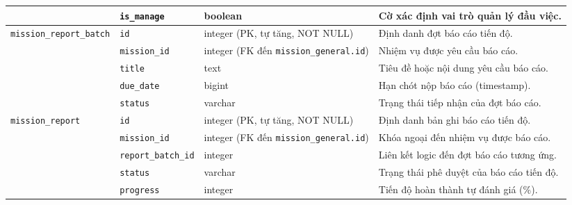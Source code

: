 \begin{xltabular}{\textwidth}{|L{2.7cm}|L{2.6cm}|L{4.2cm}|Y|}
 & \texttt{is\_manage} & boolean & Cờ xác định vai trò quản lý đầu việc. \\
\hline
\texttt{mission\_report\_batch} & \texttt{id} & integer (PK, tự tăng, NOT NULL) & Định danh đợt báo cáo tiến độ. \\
 & \texttt{mission\_id} & integer (FK đến \texttt{mission\_general.id}) & Nhiệm vụ được yêu cầu báo cáo. \\
 & \texttt{title} & text & Tiêu đề hoặc nội dung yêu cầu báo cáo. \\
 & \texttt{due\_date} & bigint & Hạn chót nộp báo cáo (timestamp). \\
 & \texttt{status} & varchar & Trạng thái tiếp nhận của đợt báo cáo. \\
\hline
\texttt{mission\_report} & \texttt{id} & integer (PK, tự tăng, NOT NULL) & Định danh bản ghi báo cáo tiến độ. \\
 & \texttt{mission\_id} & integer (FK đến \texttt{mission\_general.id}) & Khóa ngoại đến nhiệm vụ được báo cáo. \\
 & \texttt{report\_batch\_id} & integer & Liên kết logic đến đợt báo cáo tương ứng. \\
 & \texttt{status} & varchar & Trạng thái phê duyệt của báo cáo tiến độ. \\
 & \texttt{progress} & integer & Tiến độ hoàn thành tự đánh giá ($\%$). \\
\end{xltabular}
